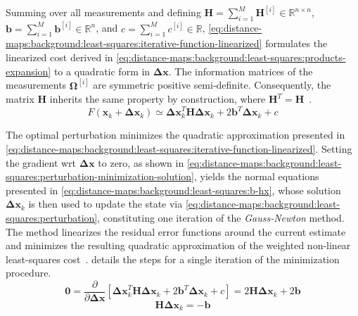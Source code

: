 Summing over all measurements and defining
$\mathbf{H} = \sum_{i=1}^M \mathbf{H}^{[i]} \in \mathbb{R}^{n \times n}$,
$\mathbf{b} = \sum_{i=1}^M \mathbf{b}^{[i]} \in \mathbb{R}^{n}$, and
$c = \sum_{i=1}^M c^{[i]} \in \mathbb{R}$,
\eqref{eq:distance-maps:background:least-squares:iterative-function-linearized}
formulates the linearized cost derived in
\eqref{eq:distance-maps:background:least-squares:products-expansion}
to a quadratic form in $\mathbf{\Delta x}$.
The information matrices of the measurements $\mathbf{\Omega}^{[i]}$ are
symmetric positive semi-definite. Consequently, the matrix $\mathbf{H}$
inherits the same property by construction, where
$\mathbf{H}^T=\mathbf{H}$~\cite{grisetti:robotics:2020}.
\begin{equation}
\label{eq:distance-maps:background:least-squares:iterative-function-linearized}
F\!\left(\mathbf{x}_k + \mathbf{\Delta x}_k\right)
\simeq
\mathbf{\Delta x}_k^T \mathbf{H} \mathbf{\Delta x}_k +
2 \mathbf{b}^T \mathbf{\Delta x}_k +
c
\end{equation}

The optimal perturbation minimizes the quadratic approximation presented in
\eqref{eq:distance-maps:background:least-squares:iterative-function-linearized}.
Setting the gradient \gls{wrt} $\mathbf{\Delta x}$ to zero, as shown in
\eqref{eq:distance-maps:background:least-squares:perturbation-minimization-solution},
yields the normal equations presented in
\eqref{eq:distance-maps:background:least-squares:b-hx}, whose solution
$\mathbf{\Delta x}_k$ is then used to update the state via
\eqref{eq:distance-maps:background:least-squares:perturbation}, constituting
one iteration of the \emph{Gauss-Newton} method.
The method linearizes the residual error functions around the current estimate
and minimizes the resulting quadratic approximation of the weighted non-linear
least-squares cost~\cite{grisetti:robotics:2020}.
 details the
steps for a single iteration of the minimization procedure.
\begin{equation}
\label{eq:distance-maps:background:least-squares:perturbation-minimization-solution}
\mathbf{0} =
\frac{\partial}{\partial \mathbf{\Delta x}}
\left[
  \mathbf{\Delta x}_k^T \mathbf{H} \mathbf{\Delta x}_k
  + 2 \mathbf{b}^T \mathbf{\Delta x}_k + c
\right] = 2\mathbf{H} \mathbf{\Delta x}_k + 2\mathbf{b}
\end{equation}
\begin{equation}\label{eq:distance-maps:background:least-squares:b-hx}
\mathbf{H} \mathbf{\Delta x}_k = -\mathbf{b}
\end{equation}

